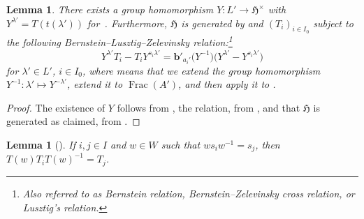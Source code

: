 \documentclass[pdftex]{sigma}
\newtheorem{Lemma}[Theorem]{Lemma}
\theoremstyle{definition}
\numberwithin{equation}{section}
\begin{document}
\begin{Lemma}\label{sec:lem-bernstein}
 There exists a group homomorphism $Y\colon L'\!\to\!\mathfrak{H}^\times$ with
 $Y^{\lambda'}\! = T(t(\lambda'))$ for~. Furthermore,
 $\mathfrak{H}$ is generated by  and $(T_i)_{i\in I_0}$ subject to the
 following Bernstein--Lusztig--Zelevinsky relation:\footnote{Also referred to as Bernstein relation, Bernstein--Zelevinsky cross relation, or Lusztig's relation.}
 \begin{equation}\label{eq:y-bernstein}
 Y^{\lambda'} T_i - T_i Y^{s_i\lambda'} = \bm{b}'_{a_i'}\bigl(Y^{-1}\bigr)
 \bigl(Y^{\lambda'} - Y^{s_i\lambda'}\bigr)
 \end{equation}
 for $\lambda'\in L'$, $i\in I_0$,
 where  means that we extend the group homomorphism
 $Y^{-1}\colon \lambda'\mapsto Y^{-\lambda'}$, extend it to $\operatorname{Frac}(A')$, and then apply it to .
\end{Lemma}
\begin{proof}
 The existence of $Y$ follows from \cite[equation~(3.2.2)]{macdonald}, the
 relation, from \cite[Section~4.2.4]{macdonald}, and that $\mathfrak{H}$ is
 generated as claimed, from \cite[Section~4.2.7]{macdonald}.
\end{proof}

\begin{Lemma}[{\cite[Section~3.1.8]{macdonald}}]\label{sec:permute-simple-reflections}
 If $i,j\in I$ and $w\in W$ such that
 $ws_iw^{-1} = s_j$, then
$
 T(w)T_iT(w)^{-1} = T_j$.
\end{Lemma}
\end{document}
